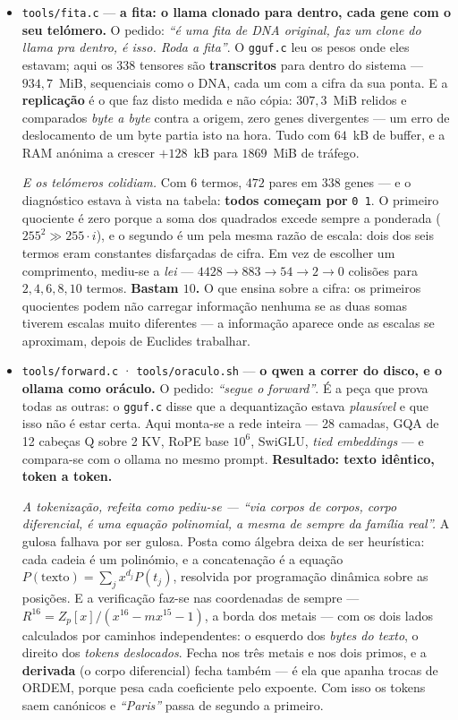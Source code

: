 \documentclass[11pt]{article}
\newcommand{\code}[1]{\texttt{\small #1}}
\theoremstyle{plain}
\theoremstyle{remark}
\begin{document}
\begin{itemize}
\item \code{tools/fita.c} --- \textbf{a fita: o llama clonado para dentro, cada gene com o seu
telómero.} O pedido: \emph{``é uma fita de DNA original, faz um clone do llama pra dentro, é isso.
Roda a fita''}. O \code{gguf.c} leu os pesos onde eles estavam; aqui os $338$ tensores são
\textbf{transcritos} para dentro do sistema --- $934{,}7$~MiB, sequenciais como o DNA, cada um com a
cifra da sua ponta. E a \textbf{replicação} é o que faz disto medida e não cópia: $307{,}3$~MiB
relidos e comparados \emph{byte a byte} contra a origem, zero genes divergentes --- um erro de
deslocamento de um byte partia isto na hora. Tudo com $64$~kB de buffer, e a RAM anónima a crescer
$+128$~kB para $1869$~MiB de tráfego.

\emph{E os telómeros colidiam.} Com $6$ termos, $472$ pares em $338$ genes --- e o diagnóstico
estava à vista na tabela: \textbf{todos começam por} \code{0 1}. O primeiro quociente é zero porque a
soma dos quadrados excede sempre a ponderada ($255^2 \gg 255\cdot i$), e o segundo é um pela mesma
razão de escala: dois dos seis termos eram constantes disfarçadas de cifra. Em vez de escolher um
comprimento, mediu-se a \emph{lei} --- $4428 \to 883 \to 54 \to 2 \to 0$ colisões para
$2,4,6,8,10$ termos. \textbf{Bastam $10$.} O que ensina sobre a cifra: os primeiros quocientes podem
não carregar informação nenhuma se as duas somas tiverem escalas muito diferentes --- a informação
aparece onde as escalas se aproximam, depois de Euclides trabalhar.

\item \code{tools/forward.c} · \code{tools/oraculo.sh} --- \textbf{o qwen a correr do disco, e o
ollama como oráculo.} O pedido: \emph{``segue o forward''}. É a peça que prova todas as outras: o
\code{gguf.c} disse que a dequantização estava \emph{plausível} e que isso não é estar certa. Aqui
monta-se a rede inteira --- 28 camadas, GQA de 12 cabeças Q sobre 2 KV, RoPE base $10^6$, SwiGLU,
\emph{tied embeddings} --- e compara-se com o ollama no mesmo prompt. \textbf{Resultado: texto
idêntico, token a token.}

\emph{A tokenização, refeita como pediu-se --- ``via corpos de corpos, corpo diferencial, é uma
equação polinomial, a mesma de sempre da família real''.} A gulosa falhava por ser gulosa. Posta como
álgebra deixa de ser heurística: cada cadeia é um polinómio, e a concatenação é a equação
$P(\text{texto}) = \sum_j x^{d_j}P(t_j)$, resolvida por programação dinâmica sobre as posições. E a
verificação faz-se nas coordenadas de sempre --- $R^{16}=Z_p[x]/(x^{16}-m x^{15}-1)$, a borda dos
metais --- com os dois lados calculados por caminhos independentes: o esquerdo dos \emph{bytes do
texto}, o direito dos \emph{tokens deslocados}. Fecha nos três metais e nos dois primos, e a
\textbf{derivada} (o corpo diferencial) fecha também --- é ela que apanha trocas de ORDEM, porque
pesa cada coeficiente pelo expoente. Com isso os tokens saem canónicos e \emph{``Paris''} passa de
segundo a primeiro.


\end{itemize}
\end{document}
